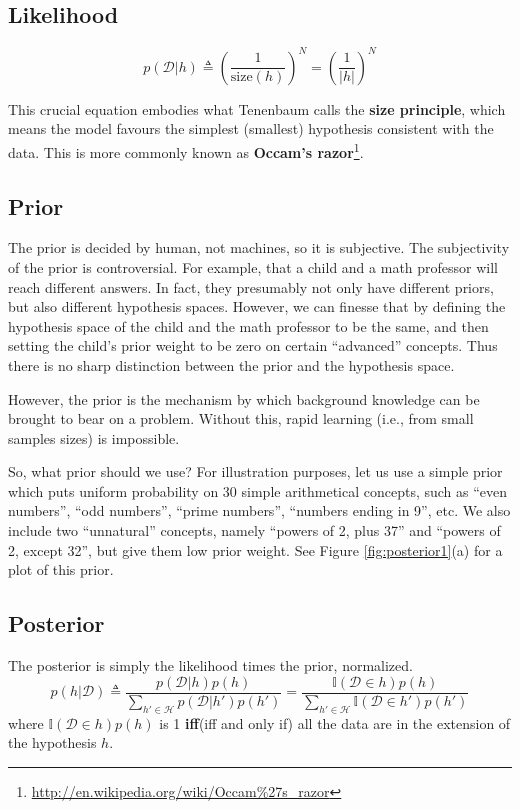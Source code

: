 \subsection{Likelihood}
\begin{equation}
p(\mathcal{D}|h) \triangleq \left(\dfrac{1}{\text{size}(h)}\right)^N=\left(\dfrac{1}{|h|}\right)^N
\end{equation}

This crucial equation embodies what Tenenbaum calls the \textbf{size principle}, which means the model favours the simplest (smallest) hypothesis consistent with the data. This is more commonly known as \textbf{Occam’s razor}\footnote{\url{http://en.wikipedia.org/wiki/Occam\%27s_razor}}.


\subsection{Prior}
The prior is decided by human, not machines, so it is subjective. The subjectivity of the prior is controversial. For example, that a child and a math professor will reach different answers. In fact, they presumably not only have different priors, but also different hypothesis spaces. However, we can finesse that by defining the hypothesis space of the child and the math professor to be the same, and then setting the child’s prior weight to be zero on certain “advanced” concepts. Thus there is no sharp distinction between the prior and the hypothesis space.

However, the prior is the mechanism by which background knowledge can be brought to bear on a problem. Without this, rapid learning (i.e., from small samples sizes) is impossible.

So, what prior should we use? For illustration purposes, let us use a simple prior which puts uniform probability on 30 simple arithmetical concepts, such as “even numbers”, “odd numbers”, “prime numbers”, “numbers ending in 9”, etc. We also include two “unnatural” concepts, namely “powers of 2, plus 37” and “powers of 2, except 32”, but give them low prior weight. See Figure \ref{fig:posterior1}(a) for a plot of this prior. 


\subsection{Posterior}
The posterior is simply the likelihood times the prior, normalized.
\begin{equation}
p(h|\mathcal{D}) \triangleq \dfrac{p(\mathcal{D}|h)p(h)}{\sum_{h' \in \mathcal{H}}p(\mathcal{D}|h')p(h')}=\dfrac{\mathbb{I}(\mathcal{D} \in h)p(h)}{\sum_{h' \in \mathcal{H}}\mathbb{I}(\mathcal{D} \in h')p(h')}
\end{equation}
where $\mathbb{I}(\mathcal{D} \in h)p(h)$ is 1 \textbf{iff}(iff and only if) all the data are in the extension of the hypothesis $h$.

